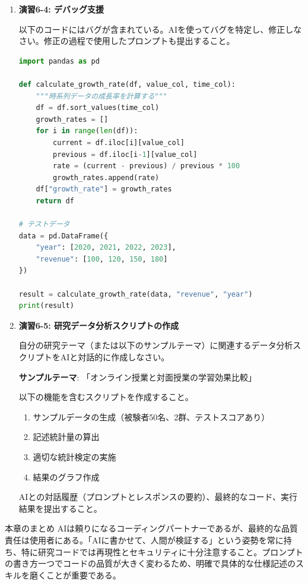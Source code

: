 \begin{enumerate}
以下のコードをAIにレビューさせ、改善版を作成しなさい。どのような問題が指摘され、どう改善されたかをレポートにまとめること。

\begin{lstlisting}[language=Python]
def proc(d):
    r = []
    for i in range(len(d)):
        if d[i] != None and d[i] > 0:
            x = d[i] * 2.5 + 10
            r.append(x)
    s = 0
    for j in r:
        s = s + j
    a = s / len(r)
    return a
\end{lstlisting}

\item \textbf{演習6-4: デバッグ支援}

以下のコードにはバグが含まれている。AIを使ってバグを特定し、修正しなさい。修正の過程で使用したプロンプトも提出すること。

\begin{lstlisting}[language=Python]
import pandas as pd

def calculate_growth_rate(df, value_col, time_col):
    """時系列データの成長率を計算する"""
    df = df.sort_values(time_col)
    growth_rates = []
    for i in range(len(df)):
        current = df.iloc[i][value_col]
        previous = df.iloc[i-1][value_col]
        rate = (current - previous) / previous * 100
        growth_rates.append(rate)
    df["growth_rate"] = growth_rates
    return df

# テストデータ
data = pd.DataFrame({
    "year": [2020, 2021, 2022, 2023],
    "revenue": [100, 120, 150, 180]
})

result = calculate_growth_rate(data, "revenue", "year")
print(result)
\end{lstlisting}

\item \textbf{演習6-5: 研究データ分析スクリプトの作成}

自分の研究テーマ（または以下のサンプルテーマ）に関連するデータ分析スクリプトをAIと対話的に作成しなさい。

\textbf{サンプルテーマ}: 「オンライン授業と対面授業の学習効果比較」

以下の機能を含むスクリプトを作成すること。
\begin{enumerate}
\item サンプルデータの生成（被験者50名、2群、テストスコアあり）
\item 記述統計量の算出
\item 適切な統計検定の実施
\item 結果のグラフ作成
\end{enumerate}

AIとの対話履歴（プロンプトとレスポンスの要約）、最終的なコード、実行結果を提出すること。

\end{enumerate}

\vspace{10mm}
\begin{itembox}[l]{本章のまとめ}
AIは頼りになるコーディングパートナーであるが、最終的な品質責任は使用者にある。「AIに書かせて、人間が検証する」という姿勢を常に持ち、特に研究コードでは再現性とセキュリティに十分注意すること。プロンプトの書き方一つでコードの品質が大きく変わるため、明確で具体的な仕様記述のスキルを磨くことが重要である。
\end{itembox}

